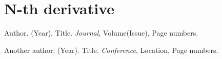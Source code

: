 \documentclass{article}
\begin{document}
\section{N-th derivative}

\begin{thebibliography}{9}
Author. (Year). Title. \textit{Journal}, Volume(Issue), Page numbers.

Another author. (Year). Title. \textit{Conference}, Location, Page numbers.

\end{thebibliography}
\end{document}
